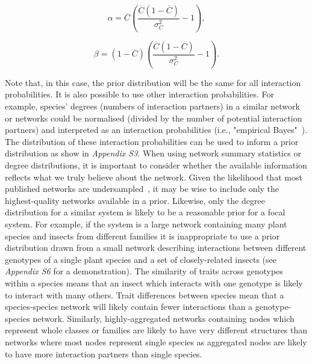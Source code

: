 \documentclass[12pt]{article}
\begin{document}
\begin{spacing}{2.0}
        \begin{equation}
        \alpha = \overline{C}(\frac{\overline{C}(1-\overline{C})}{\sigma_C^2}-1) ,
        \end{equation}

        \begin{equation}
        \beta = (1-\overline{C})(\frac{\overline{C}(1-\overline{C})}{\sigma_C^2}-1) .
        \end{equation}
  

        Note that, in this case, the prior distribution will be the same for all interaction probabilities. It is also possible to use other interaction probabilities. For example, species' degrees (numbers of interaction partners) in a similar network or networks could be normalised (divided by the number of potential interaction partners) and interpreted as an interaction probabilities (i.e., "empirical Bayes"~\citep{Spiegelhalter2000}). The distribution of these interaction probabilities can be used to inform a prior distribution as show in \emph{Appendix S3}. When using network summary statistics or degree distributions, it is important to consider whether the available information reflects what we truly believe about the network. Given the likelihood that most published networks are undersampled~\citep{Jordano2016}, it may be wise to include only the highest-quality networks available in a prior. Likewise, only the degree distribution for a similar system is likely to be a reasonable prior for a focal system. For example, if the system is a large network containing many plant species and insects from different families it is inappropriate to use a prior distribution drawn from a small network describing interactions between different genotypes of a single plant species and a set of closely-related insects (see \emph{Appendix S6} for a demonstration). The similarity of traits across genotypes within a species means that an insect which interacts with one genotype is likely to interact with many others. Trait differences between species mean that a species-species network will likely contain fewer interactions than a genotype-species network. Similarly, highly-aggregated networks containing nodes which represent whole classes or families are likely to have very different structures than networks where most nodes represent single species as aggregated nodes are likely to have more interaction partners than single species.



\end{spacing}
\end{document}
